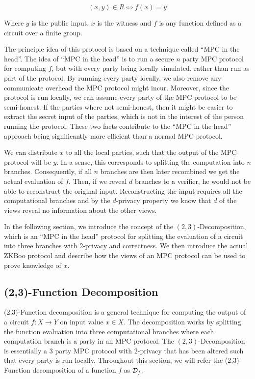 \[
  (x, y) \in R \iff f(x) = y
\]

Where $y$ is the public input, $x$ is the witness and $f$ is any function
defined as a circuit over a finite group.

The principle idea of this protocol is based on a technique called ``MPC in the
head''. The idea of ``MPC in the head'' is to run a secure $n$ party MPC protocol for computing
$f$, but with every party being locally simulated, rather than run as part of
the protocol.
By running every party locally, we also remove any communicate overhead the MPC
protocol might incur. Moreover, since the protocol is run locally, we can assume
every party of the MPC protocol to be semi-honest. If the parties where not
semi-honest, then it might be easier to extract the secret input of the parties,
which is not in the interest of the person running the protocol.
These two facts contribute to the ``MPC in the head'' approach being significantly
more efficient than a normal MPC protocol.

We can distribute $x$ to all the local parties, such that the output of the MPC
protocol will be $y$. In a sense, this corresponds to splitting the computation
into $n$ branches. Consequently, if all $n$ branches are then later recombined
we get the actual evaluation of $f$.
Then, if we reveal $d$ branches to a verifier, he
would not be able to reconstruct the original input. Reconstructing the input
requires all the computational branches and by the $d$-privacy
property we know that $d$ of the views reveal no information about the other views.

In the following section, we introduce the concept of the $(2,3)$-Decomposition,
which is an ``MPC in the head'' protocol for splitting the evaluation of a
circuit into three branches with $2$-privacy and correctness. We then introduce
the actual ZKBoo protocol and describe how the views of an MPC protocol can be
used to prove knowledge of $x$.

\subsection{(2,3)-Function Decomposition}
\label{subsec:decomposition}
(2,3)-Function decomposition is a general technique for computing the output of
a circuit $f : X \rightarrow Y$ on input value $x \in X$.
The decomposition works by splitting the function evaluation into three
computational branches where each computation branch is a party in an MPC
protocol. The $(2,3)$-Decomposition is essentially a $3$ party MPC protocol with
$2$-privacy that has been altered such that every party is run locally.
Throughout this section, we will refer the (2,3)-Function decomposition
of a function $f$ as $\mathcal{D}_{f}$.

